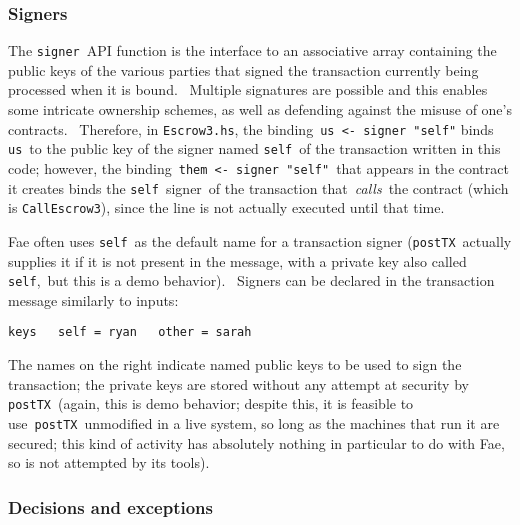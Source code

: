 \documentclass[11pt]{article}
\newcommand{\codeblock}[1]{\begin{mdframed}[
    backgroundcolor=header-color,
    linecolor=header-color,
    innertopmargin=10pt,
    ]{\texttt{#1}}\end{mdframed}}
\begin{document}
\subsubsection{Signers}
\vspace{5.5pt}

The \texttt{signer} API function is the interface to an associative array containing the public keys of the various parties that signed the transaction currently being processed when it is bound.  Multiple signatures are possible and this enables some intricate ownership schemes, as well as defending against the misuse of one's contracts.  Therefore, in \texttt{Escrow3.hs}, the binding \texttt{us }\texttt{\textless{}}\texttt{- signer "self"} binds \texttt{us} to the public key of the signer named \texttt{self} of the transaction written in this code; however, the binding \texttt{them }\texttt{\textless{}}\texttt{- signer "self"} that appears in the contract it creates binds the \texttt{self} signer of the transaction that \textit{calls} the contract (which is \texttt{CallEscrow3}), since the line is not actually executed until that time.


\vspace{11pt}

Fae often uses \texttt{self} as the default name for a transaction signer (\texttt{postTX} actually supplies it if it is not present in the message, with a private key also called \texttt{self}, but this is a demo behavior).  Signers can be declared in the transaction message similarly to inputs:

\codeblock{keys\newline
  self = ryan\newline
  other = sarah}

The names on the right indicate named public keys to be used to sign the transaction; the private keys are stored without any attempt at security by \texttt{postTX} (again, this is demo behavior; despite this, it is feasible to use \texttt{postTX} unmodified in a live system, so long as the machines that run it are secured; this kind of activity has absolutely nothing in particular to do with Fae, so is not attempted by its tools).

\subsubsection{Decisions and exceptions}
\vspace{5.5pt}
\end{document}

